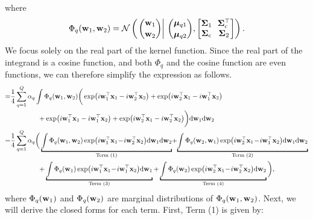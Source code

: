 where 
\begin{equation}
\begin{aligned}
\Phi_q({\mathbf w}_1,{\mathbf w}_2) = \mathcal{N}\left(\left.\binom{\mathbf{w}_{1}}{\mathbf{w}_{2}} \right\rvert\,\binom{\boldsymbol{\mu}_{q1}}{\boldsymbol{\mu}_{q2}}, \begin{bmatrix}
      \boldsymbol \Sigma_{1}\!&\!\boldsymbol \Sigma_{\text{c}}^{\top} \\
    \boldsymbol \Sigma_{\text{c}}\!&\!\boldsymbol \Sigma_2
  \end{bmatrix} \right).
\end{aligned}
\end{equation}
We focus solely on the real part of the kernel function. Since the real part of the integrand is a cosine function, and both $\Phi_q$ and the cosine function are even functions, we can therefore simplify the expression as follows.
\begin{equation}
\begin{aligned}
= &\frac{1}{4} \sum_{q=1}^Q \alpha_q \int \Phi_q(\w_1,\w_2)  \bigg(\exp(i\w_1^{\top} \x_1 - i\w_2^{\top} \x_2) + \exp(i\w_2^{\top} \x_1 - i\w_1^{\top} \x_2) \\
 &\quad\quad\quad\quad+ \exp(i\w_1^{\top} \x_1 - i\w_1^{\top} \x_2) + \exp(i\w_2^{\top} \x_1 - i\w_2^{\top} \x_2) \bigg)
\mathrm{d}\w_1 \mathrm{d}\w_2 \\
= &\frac{1}{4} \sum_{q=1}^Q \alpha_q \bigg(\underbracket{\int \Phi_q(\w_1,\w_2)\exp(i\w_1^{\top} \x_1 \!-\! i\w_2^{\top} \x_2)\mathrm{d}\w_1 \mathrm{d} \w_2}_{\text{Term~(1)}}
\!+\! \underbracket{\int \Phi_q(\w_2,\w_1)\exp(i\w_2^{\top} \x_1 \!-\! i\w_1^{\top} \x_2)\mathrm{d}\w_1 \mathrm{d}\w_2}_{\text{Term~(2)}} \\  &
\quad\quad\quad\quad +\underbracket{\int \Phi_q(\w_1)\exp(i\w_1^{\top} \x_1 \!-\! i\w_1^{\top} \x_2)\mathrm{d}\w_1}_{\text{Term~(3)}}
+\underbracket{\int \Phi_q(\w_2)\exp(i\w_2^{\top} \x_1 \!-\! i\w_2^{\top} \x_2) \mathrm{d} \w_2}_{\text{Term~(4)}}\bigg),
\end{aligned}
\end{equation}
where $\Phi_q({\mathbf w}_1)$ and $\Phi_q({\mathbf w}_2)$ are marginal distributions of $\Phi_q({\mathbf w}_1,{\mathbf w}_2)$. Next, we will derive the closed forms for each term. First, Term (1) is given by:
